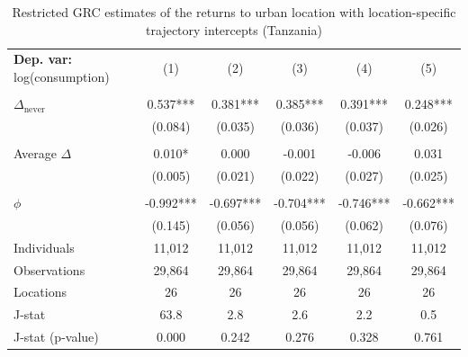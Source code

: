 \begin{table}[htbp] \centering \begin{threeparttable}
 \caption{Restricted GRC estimates of the returns to urban location with location-specific trajectory intercepts (Tanzania)} 
 \label{tab:verdier_robust_twostep_TZA_consumption_urban_unb} 
\begin{tabular}{l ccccc} \toprule  \textbf{Dep. var:}  log(consumption) 
                    &\multicolumn{1}{c}{(1)}   &\multicolumn{1}{c}{(2)}   &\multicolumn{1}{c}{(3)}   &\multicolumn{1}{c}{(4)}   &\multicolumn{1}{c}{(5)}   \\
                    &               &               &               &               &               \\
\addlinespace
$\Delta_{\text{never}}$&       0.537***&       0.381***&       0.385***&       0.391***&       0.248***\\
                    &     (0.084)   &     (0.035)   &     (0.036)   &     (0.037)   &     (0.026)   \\
                    &               &               &               &               &               \\
\addlinespace
Average $\Delta$    &       0.010*  &       0.000   &      -0.001   &      -0.006   &       0.031   \\
                    &     (0.005)   &     (0.021)   &     (0.022)   &     (0.027)   &     (0.025)   \\
                    &               &               &               &               &               \\
\addlinespace
$\phi$              &      -0.992***&      -0.697***&      -0.704***&      -0.746***&      -0.662***\\
                    &     (0.145)   &     (0.056)   &     (0.056)   &     (0.062)   &     (0.076)   \\
\addlinespace
Individuals         &      11,012   &      11,012   &      11,012   &      11,012   &      11,012   \\
Observations        &      29,864   &      29,864   &      29,864   &      29,864   &      29,864   \\
Locations           &          26   &          26   &          26   &          26   &          26   \\
J-stat              &        63.8   &         2.8   &         2.6   &         2.2   &         0.5   \\
J-stat (p-value)    &       0.000   &       0.242   &       0.276   &       0.328   &       0.761   \\

\end{tabular}
\end{threeparttable}
\end{table}
